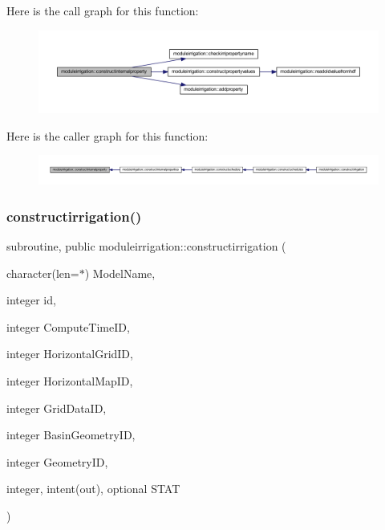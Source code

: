 Here is the call graph for this function\+:\nopagebreak
\begin{figure}[H]
\begin{center}
\leavevmode
\includegraphics[width=350pt]{namespacemoduleirrigation_ae801aa6c2bc91136e80b57fea94668d1_cgraph}
\end{center}
\end{figure}
Here is the caller graph for this function\+:\nopagebreak
\begin{figure}[H]
\begin{center}
\leavevmode
\includegraphics[width=350pt]{namespacemoduleirrigation_ae801aa6c2bc91136e80b57fea94668d1_icgraph}
\end{center}
\end{figure}
\mbox{\label{namespacemoduleirrigation_a1533651367025ce2df52f548e83ecf32}} 
\subsubsection{\texorpdfstring{constructirrigation()}{constructirrigation()}}
{\footnotesize\ttfamily subroutine, public moduleirrigation\+::constructirrigation (\begin{DoxyParamCaption}\item[{character(len=$\ast$)}]{Model\+Name,  }\item[{integer}]{id,  }\item[{integer}]{Compute\+Time\+ID,  }\item[{integer}]{Horizontal\+Grid\+ID,  }\item[{integer}]{Horizontal\+Map\+ID,  }\item[{integer}]{Grid\+Data\+ID,  }\item[{integer}]{Basin\+Geometry\+ID,  }\item[{integer}]{Geometry\+ID,  }\item[{integer, intent(out), optional}]{S\+T\+AT }\end{DoxyParamCaption})}

